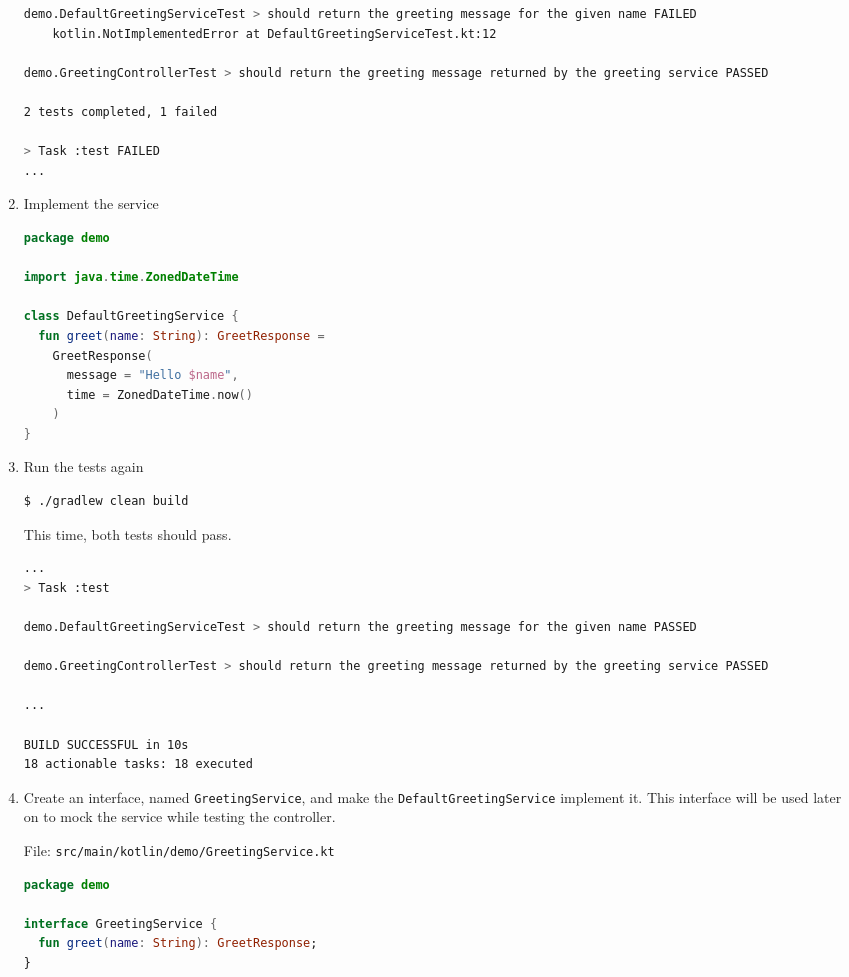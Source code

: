 \begin{enumerate}
\begin{lstlisting}[language=bash]
demo.DefaultGreetingServiceTest > should return the greeting message for the given name FAILED
    kotlin.NotImplementedError at DefaultGreetingServiceTest.kt:12

demo.GreetingControllerTest > should return the greeting message returned by the greeting service PASSED

2 tests completed, 1 failed

> Task :test FAILED
...
\end{lstlisting}

\item Implement the service

\begin{lstlisting}[language=Kotlin]
package demo

import java.time.ZonedDateTime

class DefaultGreetingService {
  fun greet(name: String): GreetResponse =
    GreetResponse(
      message = "Hello $name",
      time = ZonedDateTime.now()
    )
}
\end{lstlisting}

\item Run the tests again

\begin{lstlisting}[language=bash]
$ ./gradlew clean build
\end{lstlisting}

This time, both tests should pass.

\begin{lstlisting}[language=bash]
...
> Task :test

demo.DefaultGreetingServiceTest > should return the greeting message for the given name PASSED

demo.GreetingControllerTest > should return the greeting message returned by the greeting service PASSED

...

BUILD SUCCESSFUL in 10s
18 actionable tasks: 18 executed
\end{lstlisting}

\item Create an interface, named \texttt{GreetingService}, and make the \texttt{DefaultGreetingService} implement it.  This interface will be used later on to mock the service while testing the controller.

File: \texttt{src/main/kotlin/demo/GreetingService.kt}
\begin{lstlisting}[language=Kotlin]
package demo

interface GreetingService {
  fun greet(name: String): GreetResponse;
}
\end{lstlisting}


\end{enumerate}
